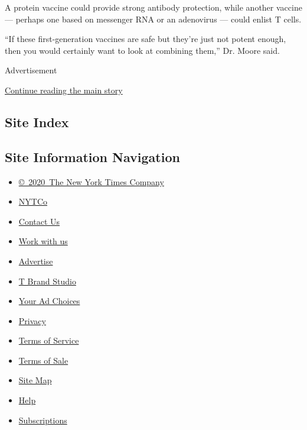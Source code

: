 A protein vaccine could provide strong antibody protection, while
another vaccine --- perhaps one based on messenger RNA or an adenovirus
--- could enlist T cells.

``If these first-generation vaccines are safe but they're just not
potent enough, then you would certainly want to look at combining
them,'' Dr. Moore said.

Advertisement

\protect\hyperlink{after-bottom}{Continue reading the main story}

\hypertarget{site-index}{%
\subsection{Site Index}\label{site-index}}

\hypertarget{site-information-navigation}{%
\subsection{Site Information
Navigation}\label{site-information-navigation}}

\begin{itemize}
\tightlist
\item
  \href{https://help.nytimes3xbfgragh.onion/hc/en-us/articles/115014792127-Copyright-notice}{©~2020~The
  New York Times Company}
\end{itemize}

\begin{itemize}
\tightlist
\item
  \href{https://www.nytco.com/}{NYTCo}
\item
  \href{https://help.nytimes3xbfgragh.onion/hc/en-us/articles/115015385887-Contact-Us}{Contact
  Us}
\item
  \href{https://www.nytco.com/careers/}{Work with us}
\item
  \href{https://nytmediakit.com/}{Advertise}
\item
  \href{http://www.tbrandstudio.com/}{T Brand Studio}
\item
  \href{https://www.nytimes3xbfgragh.onion/privacy/cookie-policy\#how-do-i-manage-trackers}{Your
  Ad Choices}
\item
  \href{https://www.nytimes3xbfgragh.onion/privacy}{Privacy}
\item
  \href{https://help.nytimes3xbfgragh.onion/hc/en-us/articles/115014893428-Terms-of-service}{Terms
  of Service}
\item
  \href{https://help.nytimes3xbfgragh.onion/hc/en-us/articles/115014893968-Terms-of-sale}{Terms
  of Sale}
\item
  \href{https://spiderbites.nytimes3xbfgragh.onion}{Site Map}
\item
  \href{https://help.nytimes3xbfgragh.onion/hc/en-us}{Help}
\item
  \href{https://www.nytimes3xbfgragh.onion/subscription?campaignId=37WXW}{Subscriptions}
\end{itemize}
